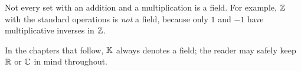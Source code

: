 \begin{warning}
Not every set with an addition and a multiplication is a field. For example, $\mathbb{Z}$ with the standard operations
is \emph{not} a field, because only $1$ and $-1$ have multiplicative inverses in $\mathbb{Z}$.
\end{warning}

\noindent In the chapters that follow, $\mathbb{K}$ always denotes a field; the reader may safely keep $\mathbb{R}$ or $\mathbb{C}$ in
mind throughout.
